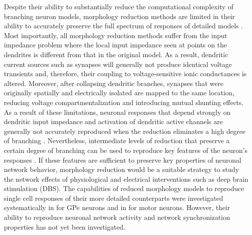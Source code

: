 %
%
%
%
Despite their ability to substantially reduce the computational complexity of
branching neuron models, morphology reduction methods are limited in their ability
to accurately preserve the full spectrum of responses of detailed models \cite{hendrickson_capabilities_2011,elbasiouny_development_2014}.
Most importantly, all morphology reduction methods suffer from the input impedance problem
\cite{deschutter2000computational} where the local input impedance seen at points on the
dendrites is different from that in the original model. As a result, dendritic current
sources such as synapses will generally not produce identical voltage transients
and, therefore, their coupling to voltage-sensitive ionic conductances is altered.
Moreover, after collapsing dendritic branches, synapses that were originally spatially and
electrically isolated are mapped to the same location, reducing voltage
compartmentalization and introducing mutual shunting effects.
As a result of these limitations, neuronal responses that depend strongly on
dendritic input impedance and activation of dendritic active channels are
generally not accurately reproduced when the reduction eliminates a high
degree of branching \cite{hendrickson_capabilities_2011,elbasiouny_development_2014}.
%
Nevertheless, intermediate levels of reduction that preserve a certain
degree of branching can be used to reproduce key features of the neuron's responses
\cite{hendrickson_capabilities_2011,elbasiouny_development_2014}.
If these features are sufficient to preserve key properties of
neuronal network behavior, morphology reduction would be a suitable strategy
to study the network effects of physiological and electrical interventions such
as deep brain stimulation (DBS). The capabilities of reduced morphology models
to reproduce single cell responses of their more detailed counterparts
were investigated systematically in \cite{hendrickson_capabilities_2011} for GPe neurons and in \cite{elbasiouny_development_2014} for motor neurons.
However, their ability to reproduce neuronal network activity and network
synchronization properties has not yet been investigated. %

